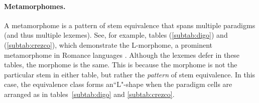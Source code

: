 \paragraph{Metamorphomes.} A metamorphome is a pattern of stem 
equivalence that spans multiple paradigms 
(and thus multiple lexemes). See, for example, tables (\ref{subtab:digo}) 
and (\ref{subtab:crezco}), which demonstrate the L-morphome, a prominent 
metamorphome in Romance languages \citep{maiden:2005}. Although the 
lexemes defer in these tables, the morphome is the same. This is because 
the morphome is not the particular stem in either table, but rather the 
\emph{pattern} of stem equivalence. In this case, the equivalence class 
forms  an``L"-shape when the paradigm cells are arranged as in tables~\ref{subtab:digo} 
and \ref{subtab:crezco}.
\begin{table}[ht]
\centering %
\vspace{7pt}
\label{tab:l-morphome}
\caption{The stem \textit{crezc-} `say' is an L-morphome in Spanish.}
\end{table}
